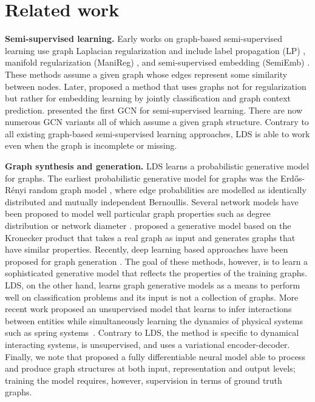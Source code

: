 \documentclass{article}
\newcommand{\lds}{\textsc{LDS}\xspace}
\begin{document}
\section{Related work}



\textbf{Semi-supervised learning.} 
Early works on graph-based semi-supervised learning use graph Laplacian regularization
and include label propagation (LP) \citep{zhu2003semi}, manifold regularization (ManiReg) \citep{belkins206manifold}, and semi-supervised embedding (SemiEmb) \citep{weston2012deep}. 
These methods assume a given graph 
whose edges represent some similarity between nodes. Later, \citep{yang2016revisiting} proposed a method that uses graphs not for regularization but rather for embedding learning by jointly classification and graph context prediction. \citet{kipf2016semi} presented the first GCN for semi-supervised learning. There are now numerous GCN variants all of which assume a given graph structure. Contrary to all existing graph-based semi-supervised learning approaches, \lds{}
is able to work even when the graph is incomplete or missing.




\textbf{Graph synthesis and generation.} \lds learns a probabilistic generative model for graphs. The earliest probabilistic generative model for graphs was the Erd\H{o}s-R\'enyi random graph model \citep{erdos1960evolution}, where edge probabilities are modelled as identically distributed and mutually independent Bernoullis. Several  network models have been proposed to model well particular graph  properties such as degree distribution \citep{leskovec2005graphs} or network diameter \citep{watts1998collective}. 
\citet{leskovec2010kronecker} proposed a generative model based on the Kronecker product that takes a real graph as input and generates graphs that have similar properties.
Recently, deep learning based approaches have been proposed for graph generation \citep{you2018graphrnn,li2018learning,grover2018graphite,de2018molgan}. The goal of these methods, however, is to learn a sophisticated generative model that reflects the properties of the training graphs. \lds, on the other hand, learns graph generative models as a means to perform well on classification problems and its input is not a collection of graphs. More recent work proposed an unsupervised model that learns to infer interactions between entities while simultaneously learning the dynamics of physical systems such as spring systems~\citep{kipf2018neural}. 
Contrary to \lds, the method is specific to dynamical interacting systems, is unsupervised, and uses a variational encoder-decoder. 
Finally, we note that \citet{johnson2017learning} proposed a fully differentiable neural model able to process and produce graph structures at both input, representation and output levels; training the model requires, however, supervision in terms of ground truth graphs.  
\end{document}

